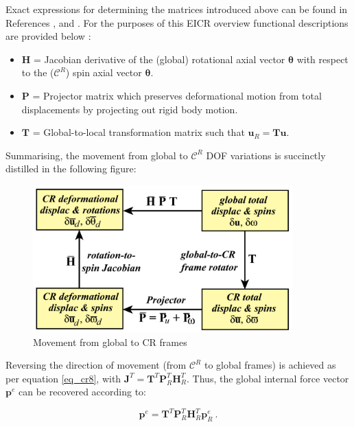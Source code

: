 Exact expressions for determining the matrices introduced above can be found in References \cite{felippa2005unified}, \cite{felippa2000systematic} and \cite{FelippaCR1_2016}. For the purposes of this EICR overview functional descriptions are provided below \cite{felippa2005unified}:

\begin{itemize}
	\item $\mathbf{H}$ = Jacobian derivative of the (global) rotational axial vector $\boldsymbol{\theta}$ with respect to the ($\mathscr{C}^R$) spin axial vector $\boldsymbol{\theta}$.
	\item $\mathbf{P}$ = Projector matrix which preserves deformational motion from total displacements by projecting out rigid body motion.
	\item $\mathbf{T}$ = Global-to-local transformation matrix such that $\mathbf{u}_R = \mathbf{T} \mathbf{u}$.
\end{itemize}

Summarising, the movement from global to $\mathscr{C}^R$ DOF variations is succinctly distilled in the following figure:

\begin{figure}[H]
	\centering
	\def\svgwidth{\columnwidth}
	\includegraphics[width=10cm]{images/cr_6.png}
	\caption{Movement from global to CR frames \cite{felippa2005unified}}
	\label{cr6}
\end{figure}

Reversing the direction of movement (from $\mathscr{C}^R$ to global frames) is achieved as per equation \ref{eq_cr8}, with $\mathbf{J}^T = \mathbf{T}^T \mathbf{P}_R^T \mathbf{H}_R^T$. Thus, the global internal force vector $\mathbf{p}^e$ can be recovered according to:

\begin{equation} 
\mathbf{p}^e
=
\mathbf{T}^T \mathbf{P}_R^T \mathbf{H}_R^T
\mathbf{p}_R^e
\label{eq_cr10}\ .
\end{equation}
 
